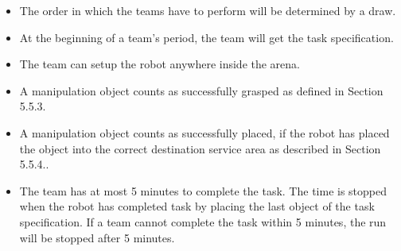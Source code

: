  \begin{itemize}
 \item The order in which the teams have to perform will be determined by a draw.
 \item At the beginning of a team’s period, the team will get the task specification.
 \item The team can setup the robot anywhere inside the arena.
 \item A manipulation object counts as successfully grasped as defined in Section 5.5.3.
 \item A manipulation object counts as successfully placed, if the robot has placed the object into the correct destination service area as described in Section 5.5.4..
 \item The team has at most 5 minutes to complete the task. The time is stopped when the robot has completed task by placing the last object of the task specification. If a team cannot complete the task within 5 minutes, the run will be stopped after 5 minutes.
 \end{itemize}

%
%
%
